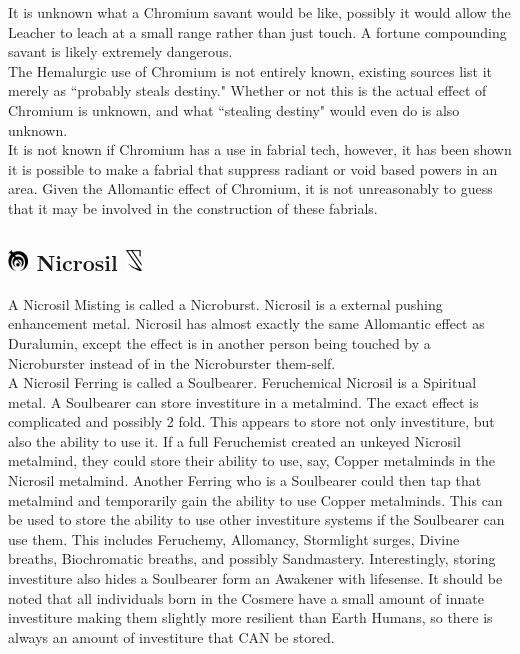 \documentclass[conference]{IEEEtran}
\begin{document}
It is unknown what a Chromium savant would be like, possibly it would allow the Leacher to leach at a small range rather than just touch. A fortune compounding savant is likely extremely dangerous.\\

The Hemalurgic use of Chromium is not entirely known, existing sources list it merely as ``probably steals destiny."\cite{HE-TB}  Whether or not this is the actual effect of Chromium is unknown, and what ``stealing destiny" would even do is also unknown.  \\

It is not known if Chromium has a use in fabrial tech, however, it has been shown it is possible to make a fabrial that suppress radiant\cite{RoW-CH9} or void\cite{RoW-CH39} based powers in an area.  Given the Allomantic effect of Chromium, it is not unreasonably to guess that it may be involved in the construction of these fabrials.
\subsection*{\includegraphics[height=1em]{images/Nicrosil.png}  Nicrosil \includegraphics[height=1em]{images/Nicrosil_(Feruchemy).png}}
A Nicrosil Misting is called a Nicroburst.\cite{ARS}  Nicrosil is a external pushing enhancement metal.\cite{AL-TB}  Nicrosil has almost exactly the same Allomantic effect as Duralumin, except the effect is in another person being touched by a Nicroburster instead of in the Nicroburster them-self.\cite{ARS}\\

A Nicrosil Ferring is called a Soulbearer.\cite{ARS}  Feruchemical Nicrosil is a Spiritual metal.\cite{FE-TB}  A Soulbearer can store investiture in a metalmind.\cite{ARS}  The exact effect is complicated and possibly 2 fold.  This appears to store not only investiture, but also the ability to use it.  If a full Feruchemist created an unkeyed Nicrosil metalmind, they could store their ability to use, say, Copper metalminds in the Nicrosil metalmind.  Another Ferring who is a Soulbearer could then tap that metalmind and temporarily gain the ability to use Copper metalminds.  This can be used to store the ability to use other investiture systems if the Soulbearer can use them.  This includes Feruchemy,\cite{BoM-CH21} Allomancy,\cite{BoM-CH28} Stormlight surges,\cite{nic-universal} Divine breaths, \cite{nic-universal}Biochromatic breaths,\cite{PvAvI} and possibly Sandmastery.  
Interestingly, storing investiture also hides a Soulbearer form an Awakener with lifesense.\cite{inv-hid}  It should be noted that all individuals born in the Cosmere have a small amount of innate investiture making them slightly more resilient than Earth Humans,\cite{PvAvI} so there is always an amount of investiture that CAN be stored.
\end{document}
